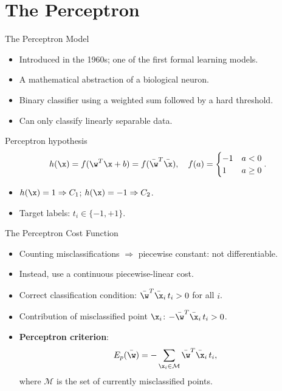 \section{The Perceptron}

\begin{frame}{The Perceptron Model}
  \begin{itemize}
    \item Introduced in the 1960s; one of the first formal learning models.
    \item A mathematical abstraction of a \alert{biological neuron}.
    \item Binary classifier using a weighted sum followed by a hard threshold.
    \item Can only classify \alert{linearly separable} data.
  \end{itemize}
  \begin{block}{Perceptron hypothesis}
    \[
      h(\x) = f(\w^T\x + b) = f(\bar{\w}^T\bar{\x}), \quad
      f(a) = \begin{cases} -1 & a < 0 \\ 1 & a \ge 0 \end{cases}.
    \]
  \end{block}
  \begin{itemize}
    \item $h(\x) = 1 \Rightarrow C_1$; \quad $h(\x) = -1 \Rightarrow C_2$.
    \item Target labels: $t_i \in \{-1, +1\}$.
  \end{itemize}
\end{frame}

\begin{frame}{The Perceptron Cost Function}
  \begin{itemize}
    \item Counting misclassifications $\Rightarrow$ piecewise constant: \alert{not differentiable}.
    \item Instead, use a \alert{continuous piecewise-linear} cost.
    \item Correct classification condition: $\bar{\w}^T\bar{\x}_i\, t_i > 0$ for all $i$.
    \item Contribution of misclassified point $\x_i$: $-\bar{\w}^T\bar{\x}_i\, t_i > 0$.
    \item \textbf{Perceptron criterion}:
    \[
      E_p(\bar{\w}) = -\sum_{\x_i \in \mathcal{M}} \bar{\w}^T\bar{\x}_i\, t_i,
    \]
    where $\mathcal{M}$ is the set of currently misclassified points.
  \end{itemize}
\end{frame}


